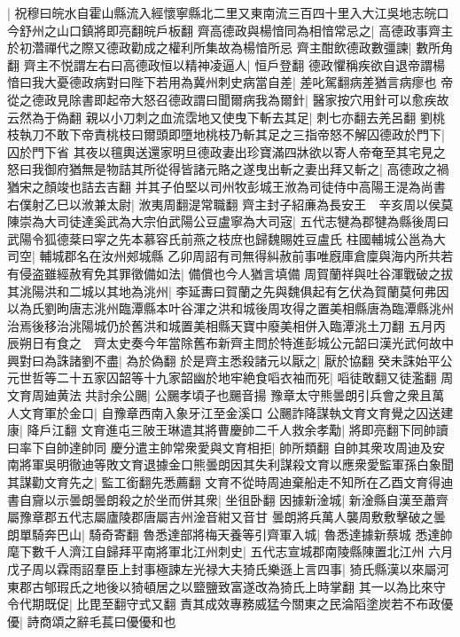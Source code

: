 |{
	祝穆曰皖水自霍山縣流入經懷寧縣北二里又東南流三百四十里入大江吳地志皖口今舒州之山口鎮將即亮翻皖戶板翻}
齊高德政與楊愔同為相愔常忌之|{
	高德政事齊主於初濳禪代之際又德政勸成之權利所集故為楊愔所忌}
齊主酣飲德政數彊諫|{
	數所角翻}
齊主不悦謂左右曰高德政恒以精神凌逼人|{
	恒戶登翻}
德政懼稱疾欲自退帝謂楊愔曰我大憂德政病對曰陛下若用為冀州刺史病當自差|{
	差叱駕翻病差猶言病瘳也}
帝從之德政見除書即起帝大怒召德政謂曰聞爾病我為爾針|{
	醫家按穴用針可以愈疾故云然為于偽翻}
親以小刀刺之血流霑地又使曳下斬去其足|{
	刺七亦翻去羌呂翻}
劉桃枝執刀不敢下帝責桃枝曰爾頭即墮地桃枝乃斬其足之三指帝怒不解囚德政於門下|{
	囚於門下省}
其夜以氊輿送還家明旦德政妻出珍寶滿四牀欲以寄人帝奄至其宅見之怒曰我御府猶無是物詰其所從得皆諸元賂之遂曳出斬之妻出拜又斬之|{
	高德政之禍猶宋之顏竣也詰去吉翻}
并其子伯堅以司州牧彭城王浟為司徒侍中高陽王湜為尚書右僕射乙巳以浟兼太尉|{
	浟夷周翻湜常職翻}
齊主封子紹亷為長安王　辛亥周以侯莫陳崇為大司徒達奚武為大宗伯武陽公豆盧寧為大司宼|{
	五代志犍為郡犍為縣後周曰武陽令狐德棻曰寜之先本慕容氏前燕之枝庶也歸魏賜姓豆盧氏}
柱國輔城公邕為大司空|{
	輔城郡名在汝州郟城縣}
乙卯周詔有司無得糾赦前事唯廐庫倉廩與海内所共若有侵盗雖經赦宥免其罪徵備如法|{
	備償也今人猶言填備}
周賀蘭祥與吐谷渾戰破之拔其洮陽洪和二城以其地為洮州|{
	李延夀曰賀蘭之先與魏俱起有乞伏為賀蘭莫何弗因以為氏劉昫唐志洮州臨潭縣本叶谷渾之洪和城後周攻得之置美相縣唐為臨潭縣洮州治焉後移治洮陽城仍於舊洪和城置美相縣天寶中廢美相併入臨潭洮土刀翻}
五月丙辰朔日有食之　齊太史奏今年當除舊布新齊主問於特進彭城公元韶曰漢光武何故中興對曰為誅諸劉不盡|{
	為於偽翻}
於是齊主悉殺諸元以厭之|{
	厭於協翻}
癸未誅始平公元世哲等二十五家囚韶等十九家韶幽於地牢絶食㗖衣袖而死|{
	㗖徒敢翻又徒濫翻}
周文育周廸黄法共討余公颺|{
	公颺孝頃子也颺音揚}
豫章太守熊曇朗引兵會之衆且萬人文育軍於金口|{
	自豫章西南入象牙江至金溪口}
公颺詐降謀執文育文育覺之囚送建康|{
	降戶江翻}
文育進屯三陂王琳遣其將曹慶帥二千人救余孝勱|{
	將即亮翻下同帥讀曰率下自帥達帥同}
慶分遣主帥常衆愛與文育相拒|{
	帥所類翻}
自帥其衆攻周迪及安南將軍吳明徹迪等敗文育退據金口熊曇朗因其失利謀殺文育以應衆愛監軍孫白象聞其謀勸文育先之|{
	監工銜翻先悉薦翻}
文育不從時周迪棄船走不知所在乙酉文育得迪書自齎以示曇朗曇朗殺之於坐而併其衆|{
	坐徂卧翻}
因據新淦城|{
	新淦縣自漢至蕭齊屬豫章郡五代志屬廬陵郡唐屬吉州淦音紺又音甘}
曇朗將兵萬人襲周敷敷擊破之曇朗單騎奔巴山|{
	騎奇寄翻}
魯悉達部將梅天養等引齊軍入城|{
	魯悉達據新蔡城}
悉達帥麾下數千人濟江自歸拜平南將軍北江州刺史|{
	五代志宣城郡南陵縣陳置北江州}
六月戊子周以霖雨詔羣臣上封事極諫左光禄大夫猗氏樂遜上言四事|{
	猗氏縣漢以來屬河東郡古郇瑕氏之地後以猗頓居之以盬鹽致富遂改為猗氏上時掌翻}
其一以為比來守令代期既促|{
	比毘至翻守式又翻}
責其成效專務威猛今關東之民淪䧟塗炭若不布政優優|{
	詩商頌之辭毛萇曰優優和也}
